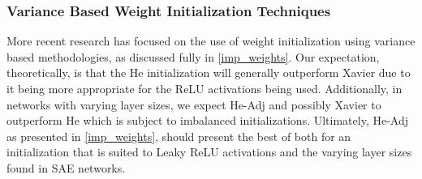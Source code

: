 \documentclass[a4paper,11pt,oneside]{article}
\theoremstyle{plain}
\theoremstyle{definition}
\begin{document}
	\subsubsection{Variance Based Weight Initialization Techniques}
	
	More recent research has focused on the use of weight initialization using variance based methodologies, as discussed fully in \ref{imp_weights}. Our expectation, theoretically, is that the He initialization will generally outperform Xavier due to it being more appropriate for the ReLU activations being used. Additionally, in networks with varying layer sizes, we expect He-Adj and possibly Xavier to outperform He which is subject to imbalanced initializations. Ultimately, He-Adj as presented in \ref{imp_weights}, should present the best of both for an initialization that is suited to Leaky ReLU activations and the varying layer sizes found in SAE networks.\newline
	
\end{document}
